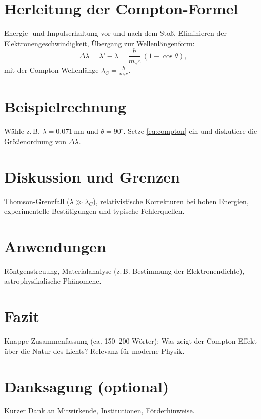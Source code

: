 \documentclass[12pt,oneside]{scrartcl}
\renewcommand*{\bibfont}{\small}
\begin{document}
	\section{Herleitung der Compton-Formel}
	Energie- und Impulserhaltung vor und nach dem Stoß, Eliminieren der Elektronengeschwindigkeit, Übergang zur Wellenlängenform:
	\begin{equation}
		\Delta\lambda = \lambda' - \lambda = \frac{h}{m_e c}\,(1 - \cos\theta),
		\label{eq:compton}
	\end{equation}
	mit der Compton-Wellenlänge $\lambda_C = \tfrac{h}{m_e c}$.
	
	\section{Beispielrechnung}
	Wähle z.\,B. $\lambda = \SI{0.071}{\nano\meter}$ und $\theta=90^\circ$. 
	Setze \cref{eq:compton} ein und diskutiere die Größenordnung von $\Delta\lambda$.
	
	\section{Diskussion und Grenzen}
	Thomson-Grenzfall ($\lambda \gg \lambda_C$), relativistische Korrekturen bei hohen Energien, 
	experimentelle Bestätigungen und typische Fehlerquellen.
	
	\section{Anwendungen}
	Röntgenstreuung, Materialanalyse (z.\,B. Bestimmung der Elektronendichte), astrophysikalische Phänomene.
	
	\section{Fazit}
	Knappe Zusammenfassung (ca. 150–200 Wörter): 
	Was zeigt der Compton-Effekt über die Natur des Lichts? 
	Relevanz für moderne Physik.
	
	\section*{Danksagung (optional)}
	Kurzer Dank an Mitwirkende, Institutionen, Förderhinweise.
	
	\renewcommand*{\bibfont}{\small}
	
\end{document}
